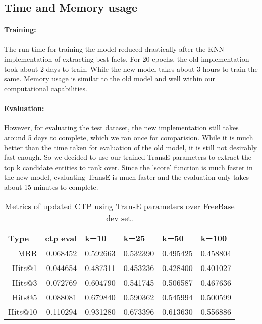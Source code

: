 \documentclass[Other]{iitddiss}
\begin{document}
\newpage
\subsection{Time and Memory usage}
\paragraph{Training:}
The run time for training the model reduced drastically after the KNN implementation of extracting best facts. For 20 epochs, the old implementation took about 2 days to train. While the new model takes about 3 hours to train the same. Memory usage is similar to the old model and well within our computational capabilities.

\paragraph{Evaluation:}
However, for evaluating the test dataset, the new implementation still takes around 5 days to complete, which we ran once for comparision. While it is much better than the time taken for evaluation of the old model, it is still not desirably fast enough. So we decided to use our trained TransE parameters to extract the top k candidate entities to rank over. Since the 'score' function is much faster in the new model, evaluating TransE is much faster and the evaluation only takes about 15 minutes to complete.

\begin{table}[H]
	\centering
	\begin{tabular}{|r|r|r|r|r|r|}
		\hline
		\multicolumn{1}{|l|}{\textbf{Type}} & \multicolumn{1}{l|}{\textbf{ctp eval}} & \multicolumn{1}{l|}{\textbf{k=10}} & \multicolumn{1}{l|}{\textbf{k=25}} & \multicolumn{1}{l|}{\textbf{k=50}} & \multicolumn{1}{l|}{\textbf{k=100}} \\ \hline
		MRR		& 0.068452                                    & 0.592663    & 0.532390      	&0.495425  & 0.458804                              \\ \hline
		Hits@1	& 0.044654                                    & 0.487311	& 0.453236		&0.428400  & 0.401027                                   \\ \hline
		Hits@3	& 0.072769                                    & 0.604790	& 0.541745		&0.506587  & 0.467636                                   \\ \hline
		Hits@5	& 0.088081                                    & 0.679840	& 0.590362		&0.545994  & 0.500599                                    \\ \hline
		Hits@10	& 0.110294                                    & 0.931280	& 0.673396	&0.613630  & 0.556886                                  \\ \hline
	\end{tabular}
	\caption{Metrics of updated CTP using TransE parameters over FreeBase dev set. }
	\label{tab:transE_MRR}
\end{table}
\end{document}
